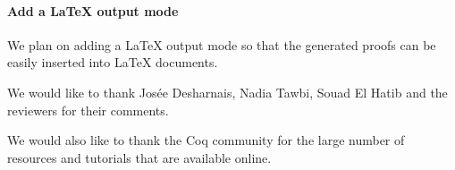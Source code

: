 \documentclass[sigplan,screen,9pt]{acmart}
\begin{document}
\paragraph{Add a LaTeX output mode} 
We plan on adding a LaTeX output mode so that the generated proofs can be easily inserted into LaTeX documents.

\begin{acks}
  We would like to thank Josée Desharnais, Nadia Tawbi, Souad El Hatib and the reviewers for their comments.

  We would also like to thank the Coq community for the large number of resources and tutorials that are available online.
\end{acks}


\end{document}
